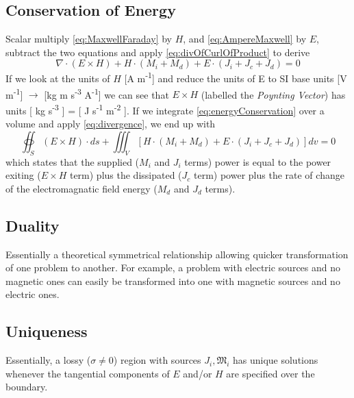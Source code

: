 \documentclass{article}
\numberwithin{equation}{section}
\begin{document}
        \subsection{Conservation of Energy}
            Scalar multiply \eqref{eq:MaxwellFaraday} by $H$, and
            \eqref{eq:AmpereMaxwell} by $E$, subtract the two equations and apply
            \eqref{eq:divOfCurlOfProduct} to derive
            \begin{equation} \label{eq:energyConservation}
                \nabla \cdot ( E \times H) + H \cdot ( M_i + M_d ) + E \cdot ( J_i + J_c
                + J_d ) = 0
            \end{equation}
            If we look at the units of $H$ [A m\textsuperscript{-1}] and reduce the
            units of E to SI base units [V m\textsuperscript{-1}] $\to$ [kg m
            s\textsuperscript{-3} A\textsuperscript{-1}] we can see that $E \times H$
            (labelled the \emph{Poynting Vector}) has units [ kg s\textsuperscript{-3} ]
            = [ J s\textsuperscript{-1} m\textsuperscript{-2} ]. If we integrate
            \eqref{eq:energyConservation} over a volume and apply \eqref{eq:divergence},
            we end up with
            \begin{equation} \label{eq:energyConservationIntegral}
                \oiint_S ( E \times H) \cdot ds + \iiint_V [ H \cdot ( M_i + M_d ) + E
                \cdot ( J_i + J_c + J_d )] dv = 0
            \end{equation}
            which states that the supplied ($M_i$ and $J_i$ terms) power is equal to the
            power exiting ($E \times H$ term) plus the dissipated ($J_c$ term) power
            plus the rate of change of the electromagnatic field energy ($M_d$ and $J_d$
            terms).
        \subsection{Duality}
            Essentially a theoretical symmetrical relationship allowing quicker
            transformation of one problem to another. For example, a problem with
            electric sources and no magnetic ones can easily be transformed into one
            with magnetic sources and no electric ones.
        \subsection{Uniqueness}
            Essentially, a lossy ($\sigma \neq 0$) region with sources $J_i,
            \mathfrak{M}_i$ has unique solutions whenever the tangential components of
            $E$ and/or $H$ are specified over the boundary.
\end{document}
